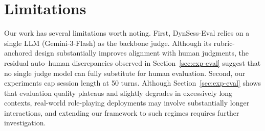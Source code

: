 \documentclass[11pt]{article}
\begin{document}
\begin{abstract}
\end{abstract}







\section{Limitations}
Our work has several limitations worth noting.
First, DynSess-Eval relies on a single LLM (Gemini-3-Flash) as the backbone judge. Although its rubric-anchored design substantially improves alignment with human judgments, the residual auto--human discrepancies observed in Section~\ref{sec:exp-eval} suggest that no single judge model can fully substitute for human evaluation. Second, our experiments cap session length at 50 turns. Although Section~\ref{sec:exp-eval} shows that evaluation quality plateaus and slightly degrades in excessively long contexts, real-world role-playing deployments may involve substantially longer interactions, and extending our framework to such regimes requires further investigation.
\end{document}
